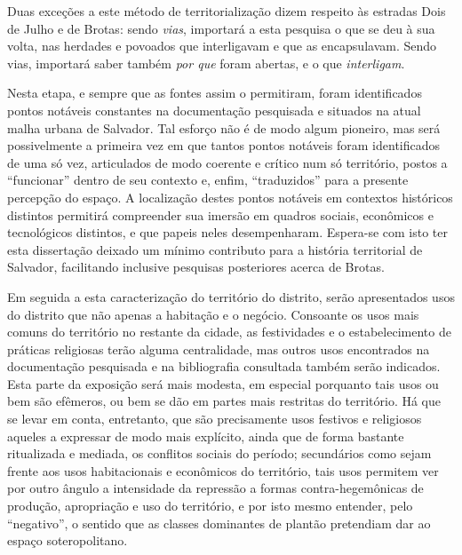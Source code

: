 Duas exceções a este método de territorialização dizem respeito às estradas Dois de Julho e de Brotas: sendo \textit{vias}, importará a esta pesquisa o que se deu à sua volta, nas herdades e povoados que interligavam e que as encapsulavam. Sendo vias, importará saber também \textit{por que} foram abertas, e o que \textit{interligam}.

Nesta etapa, e sempre que as fontes assim o permitiram, foram identificados pontos notáveis constantes na documentação pesquisada e situados na atual malha urbana de Salvador. Tal esforço não é de modo algum pioneiro, mas será possivelmente a primeira vez em que tantos pontos notáveis foram identificados de uma só vez, articulados de modo coerente e crítico num só território, postos a ``funcionar'' dentro de seu contexto e, enfim, ``traduzidos'' para a presente percepção do espaço. A localização destes pontos notáveis em contextos históricos distintos permitirá compreender sua imersão em quadros sociais, econômicos e tecnológicos distintos, e que papeis neles desempenharam. Espera-se com isto ter esta dissertação deixado um mínimo contributo para a história territorial de Salvador, facilitando inclusive pesquisas posteriores acerca de Brotas. 

Em seguida a esta caracterização do território do distrito, serão apresentados usos do distrito que não apenas a habitação e o negócio. Consoante os usos mais comuns do território no restante da cidade, as festividades e o estabelecimento de práticas religiosas terão alguma centralidade, mas outros usos encontrados na documentação pesquisada e na bibliografia consultada também serão indicados. Esta parte da exposição será mais modesta, em especial porquanto tais usos ou bem são efêmeros, ou bem se dão em partes mais restritas do território. Há que se levar em conta, entretanto, que são precisamente usos festivos e religiosos aqueles a expressar de modo mais explícito, ainda que de forma bastante ritualizada e mediada, os conflitos sociais do período; secundários como sejam frente aos usos habitacionais e econômicos do território, tais usos permitem ver por outro ângulo a intensidade da repressão a formas contra-hegemônicas de produção, apropriação e uso do território, e por isto mesmo entender, pelo ``negativo'', o sentido que as classes dominantes de plantão pretendiam dar ao espaço soteropolitano.


